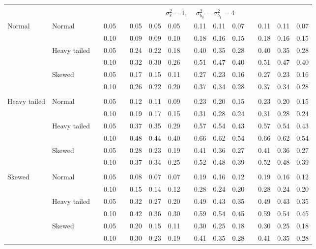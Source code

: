 \documentclass[11pt]{article} %
\begin{document}
\begin{table}[ht]
\begin{scriptsize}
\begin{center}
\begin{tabular}{ll p{.1cm} c p{.1cm} rrr p{.1cm} rrr p{.1cm} rrr}
&&&&&&&&&&&&&&&\\
& && && \multicolumn{9}{c}{$\sigma_{\varepsilon}^2 = 1$, \ \ $\sigma_{b_0}^2 = \sigma_{b_1}^2 = 4$} \\ \cline{6-16}
Normal       & Normal       && 0.05 &&  0.05 & 0.05 & 0.05 && 0.11 & 0.11 & 0.07 && 0.11 & 0.11 & 0.07 \\ 
             &              && 0.10 &&  0.09 & 0.09 & 0.10 && 0.18 & 0.16 & 0.15 && 0.18 & 0.16 & 0.15 \\ 
             & Heavy tailed && 0.05 &&  0.24 & 0.22 & 0.18 && 0.40 & 0.35 & 0.28 && 0.40 & 0.35 & 0.28 \\ 
             &              && 0.10 &&  0.32 & 0.30 & 0.26 && 0.51 & 0.47 & 0.40 && 0.51 & 0.47 & 0.40 \\ 
             & Skewed       && 0.05 &&  0.17 & 0.15 & 0.11 && 0.27 & 0.23 & 0.16 && 0.27 & 0.23 & 0.16 \\ 
             &              && 0.10 &&  0.26 & 0.22 & 0.20 && 0.37 & 0.34 & 0.28 && 0.37 & 0.34 & 0.28 \\ 
             &&&&&&&&&&&&&&&\\
Heavy tailed & Normal       && 0.05 &&  0.12 & 0.11 & 0.09 && 0.23 & 0.20 & 0.15 && 0.23 & 0.20 & 0.15 \\ 
             &              && 0.10 &&  0.19 & 0.17 & 0.15 && 0.31 & 0.28 & 0.24 && 0.31 & 0.28 & 0.24 \\ 
             & Heavy tailed && 0.05 &&  0.37 & 0.35 & 0.29 && 0.57 & 0.54 & 0.43 && 0.57 & 0.54 & 0.43 \\ 
             &              && 0.10 &&  0.48 & 0.44 & 0.40 && 0.66 & 0.62 & 0.54 && 0.66 & 0.62 & 0.54 \\ 
             & Skewed       && 0.05 &&  0.28 & 0.23 & 0.19 && 0.41 & 0.36 & 0.27 && 0.41 & 0.36 & 0.27 \\ 
             &              && 0.10 &&  0.37 & 0.34 & 0.25 && 0.52 & 0.48 & 0.39 && 0.52 & 0.48 & 0.39 \\ 
             &&&&&&&&&&&&&&&\\
Skewed       & Normal       && 0.05 &&  0.08 & 0.07 & 0.07 && 0.19 & 0.16 & 0.12 && 0.19 & 0.16 & 0.12 \\ 
             &              && 0.10 &&  0.15 & 0.14 & 0.12 && 0.28 & 0.24 & 0.20 && 0.28 & 0.24 & 0.20 \\ 
             & Heavy tailed && 0.05 &&  0.32 & 0.27 & 0.20 && 0.49 & 0.43 & 0.35 && 0.49 & 0.43 & 0.35 \\ 
             &              && 0.10 &&  0.42 & 0.36 & 0.30 && 0.59 & 0.54 & 0.45 && 0.59 & 0.54 & 0.45 \\ 
             & Skewed       && 0.05 &&  0.20 & 0.15 & 0.11 && 0.30 & 0.25 & 0.18 && 0.30 & 0.25 & 0.18 \\ 
             &              && 0.10 &&  0.30 & 0.23 & 0.19 && 0.41 & 0.35 & 0.28 && 0.41 & 0.35 & 0.28 \\ 




\end{tabular}
\end{center}
\end{scriptsize}
\end{table}
\end{document}
